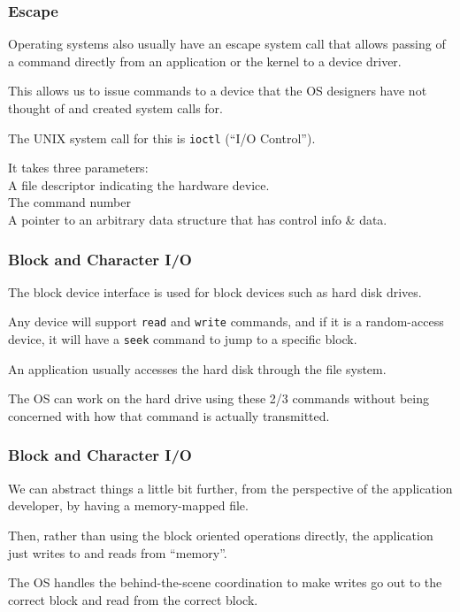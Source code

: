 \begin{frame}
\frametitle{Escape}

Operating systems also usually have an \alert{escape} system call that allows passing of a command directly from an application or the kernel to a device driver. 

This allows us to issue commands to a device that the OS designers have not thought of and created system calls for. 

The UNIX system call for this is \texttt{ioctl} (``I/O Control''). 

It takes three parameters:\\
\quad A file descriptor indicating the hardware device.\\
\quad The command number\\
\quad A pointer to an arbitrary data structure that has control info \& data.

\end{frame}

\begin{frame}
\frametitle{Block and Character I/O}

The block device interface is used for block devices such as hard disk drives. 

Any device will support \texttt{read} and \texttt{write} commands, and if it is a random-access device, it will have a \texttt{seek} command to jump to a specific block. 

An application usually accesses the hard disk through the file system.

The OS can work on the hard drive using these 2/3 commands without being concerned with how that command is actually transmitted.

\end{frame}


\begin{frame}
\frametitle{Block and Character I/O}

We can abstract things a little bit further, from the perspective of the application developer, by having a memory-mapped file. 

Then, rather than using the block oriented operations directly, the application just writes to and reads from ``memory''.

The OS handles the behind-the-scene coordination to make writes go out to the correct block and read from the correct block.


\end{frame}

